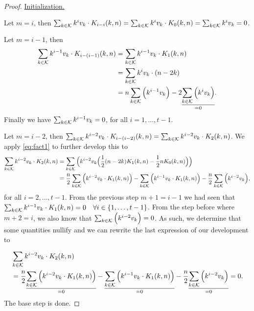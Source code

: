 \begin{proof}
    \underline{Initialization.}

    Let $m = i$, then $\sum_{k \in \mathcal{K}} k^iv_k \cdot K_{i - i}(k, n) = \sum_{k \in \mathcal{K}} k^iv_k \cdot K_{0}(k, n) = \sum_{k \in \mathcal{K}} k^iv_k = 0$.

    Let $m = i - 1$, then
    \begin{equation*}
        \begin{split}
            \sum_{k \in \mathcal{K}} k^{i-1}v_k \cdot K_{i - (i-1)}(k, n) &= \sum_{k \in \mathcal{K}} k^{i-1}v_k \cdot K_{1}(k, n)\\ &= \sum_{k \in \mathcal{K}} k^iv_k \cdot (n - 2k)\\ &= n\sum_{k \in \mathcal{K}} \Big( k^{i-1}v_k \Big) - 2\underset{=0}{\underline{\sum_{k \in \mathcal{K}} \Big( k^iv_k \Big)}}.
        \end{split}
    \end{equation*}
    Finally we have $\sum_{k \in \mathcal{K}} k^{i-1}v_k = 0$, for all $i = 1, \ldots, t-1$.

    Let $m = i - 2$, then $\sum_{k \in \mathcal{K}} k^{i-2}v_k \cdot K_{i - (i-2)}(k, n) = \sum_{k \in \mathcal{K}} k^{i-2}v_k \cdot K_{2}(k, n)$. We apply \cref{eq:fact1} to further develop this to
    \begin{equation*}
        \begin{split}
            \sum_{k \in \mathcal{K}} k^{i-2}v_k \cdot K_{2}(k, n) &= \sum_{k \in \mathcal{K}} \Big( k^{i-2}v_k \Big( \frac{1}{2}(n - 2k)K_1(k, n) - \frac{1}{2}nK_0(k, n) \Big)\Big)\\
            &= \frac{n}{2}\sum_{k \in \mathcal{K}} \Big( k^{i-2}v_k \cdot K_1(k, n) \Big) - \sum_{k \in \mathcal{K}} \Big( k^{i-1}v_k \cdot K_1(k,n) \Big) - \frac{n}{2}\sum_{k \in \mathcal{K}} \Big( k^{i-2}v_k \Big),
        \end{split}
    \end{equation*}
    for all $i = 2, \ldots, t-1$.
    From the previous step $m + 1 = i - 1$ we had seen that $\sum_{k \in \mathcal{K}} k^{i-1}v_k \cdot K_1(k, n) = 0\quad \forall i\in \{1, \ldots, t-1\}$. From the step before where $m + 2 = i$, we also know that $\sum_{k \in \mathcal{K}} \Big( k^{i-2}v_k \Big) = 0$. As such, we determine that some quantities nullify and we can rewrite the last expression of our development to

    \begin{equation*}
    \begin{split}
        &\sum_{k \in \mathcal{K}} k^{i-2}v_k \cdot K_{2}(k, n)\\
        &= \frac{n}{2}\underset{=0}{\underline{\sum_{k \in \mathcal{K}} \Big( k^{i-2}v_k \cdot K_1(k, n) \Big)}} - \underset{=0}{\underline{\sum_{k \in \mathcal{K}} \Big( k^{i-1}v_k \cdot K_1(k,n) \Big)}} - \frac{n}{2}\underset{=0}{\underline{\sum_{k \in \mathcal{K}} \Big( k^{i-2}v_k \Big)}} = 0.
    \end{split}
    \end{equation*}
    The base step is done.


\end{proof}
